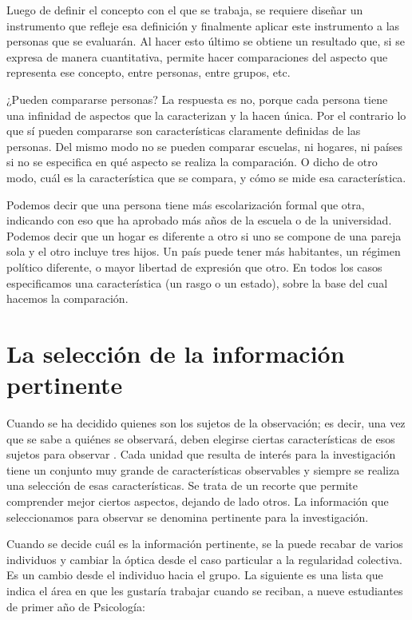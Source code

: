 \documentclass[]{book}
\begin{document}
Luego de definir el concepto con el que se trabaja, se requiere diseñar un instrumento que refleje esa definición y finalmente aplicar este instrumento a las personas que se evaluarán. Al hacer esto último se obtiene un resultado que, si se expresa de manera cuantitativa, permite hacer comparaciones del aspecto que representa ese concepto, entre personas, entre grupos, etc.

¿Pueden compararse personas? La respuesta es no, porque cada persona tiene una infinidad de aspectos que la caracterizan y la hacen única. Por el contrario lo que sí pueden compararse son características claramente definidas de las personas. Del mismo modo no se pueden comparar escuelas, ni hogares, ni países si no se especifica en qué aspecto se realiza la comparación. O dicho de otro modo, cuál es la característica que se compara, y cómo se mide esa característica.

Podemos decir que una persona tiene más escolarización formal que otra, indicando con eso que ha aprobado más años de la escuela o de la universidad. Podemos decir que un hogar es diferente a otro si uno se compone de una pareja sola y el otro incluye tres hijos. Un país puede tener más habitantes, un régimen político diferente, o mayor libertad de expresión que otro. En todos los casos especificamos una característica (un rasgo o un estado), sobre la base del cual hacemos la comparación.

\hypertarget{la-seleccion-de-la-informacion-pertinente}{%
\section{La selección de la información pertinente}\label{la-seleccion-de-la-informacion-pertinente}}

Cuando se ha decidido quienes son los sujetos de la observación; es decir, una vez que se sabe a quiénes se observará, deben elegirse ciertas características de esos sujetos para observar . Cada unidad que resulta de interés para la investigación tiene un conjunto muy grande de características observables y siempre se realiza una selección de esas características. Se trata de un recorte que permite comprender mejor ciertos aspectos, dejando de lado otros. La información que seleccionamos para observar se denomina pertinente para la investigación.

Cuando se decide cuál es la información pertinente, se la puede recabar de varios individuos y cambiar la óptica desde el caso particular a la regularidad colectiva. Es un cambio desde el individuo hacia el grupo. La siguiente es una lista que indica el área en que les gustaría trabajar cuando se reciban, a nueve estudiantes de primer año de Psicología:
\end{document}
